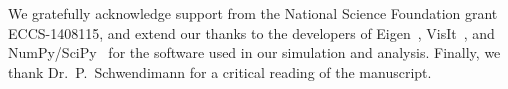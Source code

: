 \acknowledgments
We gratefully acknowledge support from the National Science Foundation grant ECCS-1408115, and extend our thanks to the developers of Eigen~\cite{Eigen}, VisIt~\cite{VisIt}, and NumPy/SciPy~\cite{NumPy,SciPy} for the software used in our simulation and analysis.
Finally, we thank Dr.\ P.\ Schwendimann for a critical reading of the manuscript.
\vspace{.5 cm}
